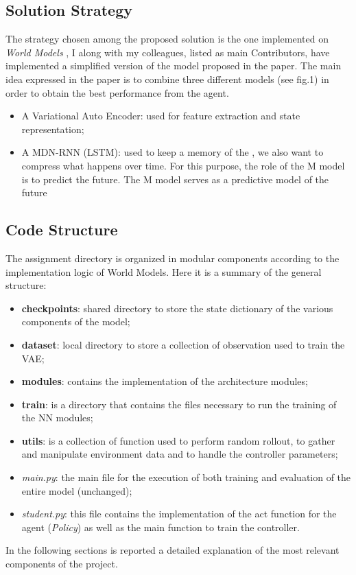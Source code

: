\documentclass[10pt,a4paper]{article}
\begin{document}
\subsection{Solution Strategy}
The strategy chosen among the proposed solution is the one implemented on \textit{World Models} \cite{DBLP:journals/corr/abs-1803-10122}, I along with my colleagues, listed as main Contributors, have implemented a simplified version of the model proposed in the paper. The main idea expressed in the paper is to combine three different models (see fig.1) in order to obtain the best performance from the agent. 
\begin{itemize}
    \item A Variational Auto Encoder: used for feature extraction and state representation;
    \item A MDN-RNN (LSTM): used to keep a memory of the , we also want to compress
    what happens over time. For this purpose, the role of the
    M model is to predict the future. The M model serves as a
    predictive model of the future
\end{itemize}
\newpage

\subsection{Code Structure}
The assignment directory is organized in modular components according to the implementation logic of World Models. Here it is a summary of the general structure:
\begin{itemize}
    \item \textbf{checkpoints}: shared directory to store the state dictionary of the various components of the model;
    \item \textbf{dataset}: local directory to store a collection of observation used to train the VAE;
    \item \textbf{modules}: contains the implementation of the architecture modules;
    \item \textbf{train}: is a directory that contains the files necessary to run the training of the NN modules;
    \item \textbf{utils}: is a collection of function used to perform random rollout, to gather and manipulate environment data and to handle the controller parameters;
    \item \textit{main.py}: the main file for the execution of both training and evaluation of the entire model (unchanged);
    \item \textit{student.py}: this file contains the implementation of the act function for the agent (\textit{Policy}) as well as the main function to train the controller.
\end{itemize}
In the following sections is reported a detailed explanation of the most relevant components of the project.
\end{document}
